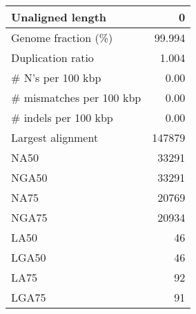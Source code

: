 \documentclass[12pt,a4paper]{article}
\begin{document}
\begin{table}[ht]
\begin{center}
\begin{tabular}{|l*{1}{|r}|}
Unaligned length & 0 \\ \hline
Genome fraction (\%) & 99.994 \\ \hline
Duplication ratio & 1.004 \\ \hline
\# N's per 100 kbp & 0.00 \\ \hline
\# mismatches per 100 kbp & 0.00 \\ \hline
\# indels per 100 kbp & 0.00 \\ \hline
Largest alignment & 147879 \\ \hline
NA50 & 33291 \\ \hline
NGA50 & 33291 \\ \hline
NA75 & 20769 \\ \hline
NGA75 & 20934 \\ \hline
LA50 & 46 \\ \hline
LGA50 & 46 \\ \hline
LA75 & 92 \\ \hline
LGA75 & 91 \\ \hline
\end{tabular}
\end{center}
\end{table}
\end{document}
